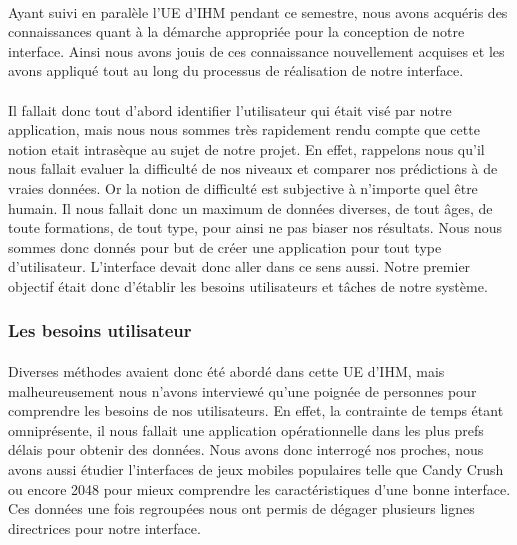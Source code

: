 \documentclass[../main.tex]{subfiles}
\begin{document}
\paragraph{}
Ayant suivi en paralèle l'UE d'IHM pendant ce semestre, nous avons acquéris des connaissances quant à la démarche appropriée pour la conception de notre interface. Ainsi nous avons jouis de ces connaissance nouvellement acquises et les avons appliqué tout au long du processus de réalisation de notre interface.

\paragraph{}
Il fallait donc tout d'abord identifier l'utilisateur qui était visé par notre application, mais nous nous sommes très rapidement rendu compte que cette notion etait intrasèque au sujet de notre projet. En effet, rappelons nous qu'il nous fallait evaluer la difficulté de nos niveaux et comparer nos prédictions à de vraies données. Or la notion de difficulté est subjective à n'importe quel être humain. Il nous fallait donc un maximum de données diverses, de tout âges, de toute formations, de tout type, pour ainsi ne pas biaser nos résultats. Nous nous sommes donc donnés pour but de créer une application pour tout type d'utilisateur. L'interface devait donc aller dans ce sens aussi. Notre premier objectif était donc d'établir les besoins utilisateurs et tâches de notre système.

	\subsubsection{Les besoins utilisateur}

\paragraph{}
Diverses méthodes avaient donc été abordé dans cette UE d'IHM, mais malheureusement nous n'avons interviewé qu'une poignée de personnes pour comprendre les besoins de nos utilisateurs. En effet, la contrainte de temps étant omniprésente, il nous fallait une application opérationnelle dans les plus prefs délais pour obtenir des données. Nous avons donc interrogé nos proches, nous avons aussi étudier l'interfaces de jeux mobiles populaires telle que Candy Crush ou encore 2048 pour mieux comprendre les caractéristiques d'une bonne interface. Ces données une fois regroupées nous ont permis de dégager plusieurs lignes directrices pour notre interface.
\end{document}
